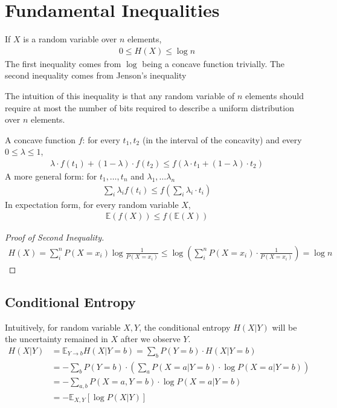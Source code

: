 \section{Fundamental Inequalities}
\begin{theorem}
    If $X$ is a random variable over $n$ elements,
    \begin{align*}
        0 \le H(X) \le \log n
    \end{align*}
    The first inequality comes from $\log$ being a concave function trivially. The second inequality comes from Jenson's inequality
\end{theorem}
\begin{note}
    The intuition of this inequality is that any random variable of $n$ elements should require at most the number of bits required to describe a uniform distribution over $n$ elements.
\end{note}
\begin{lemma}
    A concave function $f$: for every $t_1, t_2$ (in the interval of the concavity) and every $0 \le \lambda \le 1$,
    \begin{align}
        \lambda \cdot f(t_1) + (1 - \lambda) \cdot f(t_2) \le f(\lambda \cdot t_1 + (1 - \lambda) \cdot t_2)
    \end{align}
    A more general form: for $t_1, \ldots, t_n$ and $\lambda_1, \ldots \lambda_n$
    \begin{align}
        \sum_{i} \lambda_i f(t_i) \le f(\sum_i \lambda_i \cdot t_i)
    \end{align}
    In expectation form, for every random variable $X$,
    \begin{align}
        \mathbb{E}(f(X)) \le f(\mathbb{E}(X))
    \end{align}
\end{lemma}
\begin{proof}[Proof of Second Inequality]
    \begin{align}
        H(X) = \sum_{i}^{n} P(X = x_i) \log \frac{1}{P(X = x_i)} \le \log (\sum_{i}^{n} P(X = x_i) \cdot \frac{1}{P(X = x_i)}) = \log n 
    \end{align}
\end{proof}

\subsection{Conditional Entropy}
Intuitively, for random variable $X, Y$, the conditional entropy $H(X | Y)$ will be the uncertainty remained in $X$ after we observe $Y$.
\begin{align}
    H(X | Y) &= \mathbb{E}_{Y \to b} H(X | Y = b) = \sum_{b} P(Y = b) \cdot H(X | Y = b)
    \\ &= - \sum_{b} P(Y = b) \cdot (\sum_{a} P(X = a | Y = b) \cdot \log P(X = a | Y = b))
    \\ &= - \sum_{a, b} P(X = a, Y = b) \cdot \log P(X = a | Y = b)
    \\ &= - \mathbb{E}_{X, Y} \left[ \log P(X | Y) \right]
\end{align}